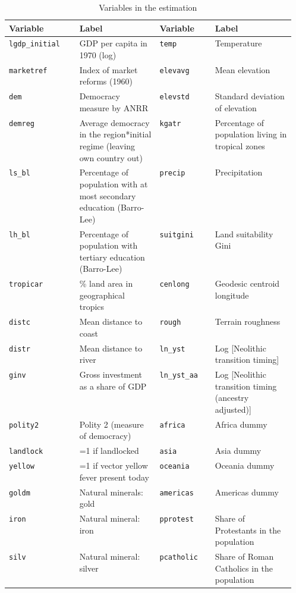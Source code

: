 \begin{table}[!htbp]
\centering
\caption{Variables in the estimation}
\label{tab:used_variables}
\begin{threeparttable}
\begin{tabular}{lp{0.28\linewidth}lp{0.28\linewidth}}
\toprule
Variable & \raggedright Label & Variable & \raggedright Label \tabularnewline
\midrule
\texttt{lgdp\_initial} & \raggedright GDP per capita in 1970 (log) & \texttt{temp} & \raggedright Temperature \tabularnewline
\texttt{marketref} & \raggedright Index of market reforms (1960) & \texttt{elevavg} & \raggedright Mean elevation \tabularnewline
\texttt{dem} & \raggedright Democracy measure by ANRR & \texttt{elevstd} & \raggedright Standard deviation of elevation \tabularnewline
\texttt{demreg} & \raggedright Average democracy in the region*initial regime (leaving own country out) & \texttt{kgatr} & \raggedright Percentage of population living in tropical zones \tabularnewline
\texttt{ls\_bl} & \raggedright Percentage of population with at most secondary education (Barro-Lee) & \texttt{precip} & \raggedright Precipitation \tabularnewline
\texttt{lh\_bl} & \raggedright Percentage of population with tertiary education (Barro-Lee) & \texttt{suitgini} & \raggedright Land suitability Gini \tabularnewline
\texttt{tropicar} & \raggedright \% land area in geographical tropics & \texttt{cenlong} & \raggedright Geodesic centroid longitude \tabularnewline
\texttt{distc} & \raggedright Mean distance to coast & \texttt{rough} & \raggedright Terrain roughness \tabularnewline
\texttt{distr} & \raggedright Mean distance to river & \texttt{ln\_yst} & \raggedright Log [Neolithic transition timing] \tabularnewline
\texttt{ginv} & \raggedright Gross investment as a share of GDP & \texttt{ln\_yst\_aa} & \raggedright Log [Neolithic transition timing (ancestry adjusted)] \tabularnewline
\texttt{polity2} & \raggedright Polity 2 (measure of democracy) & \texttt{africa} & \raggedright Africa dummy \tabularnewline
\texttt{landlock} & \raggedright =1 if landlocked & \texttt{asia} & \raggedright Asia dummy \tabularnewline
\texttt{yellow} & \raggedright =1 if vector yellow fever present today & \texttt{oceania} & \raggedright Oceania dummy \tabularnewline
\texttt{goldm} & \raggedright Natural minerals: gold & \texttt{americas} & \raggedright Americas dummy \tabularnewline
\texttt{iron} & \raggedright Natural mineral: iron & \texttt{pprotest} & \raggedright Share of Protestants in the population \tabularnewline
\texttt{silv} & \raggedright Natural mineral: silver & \texttt{pcatholic} & \raggedright Share of Roman Catholics in the population \tabularnewline

\end{tabular}
\end{threeparttable}
\end{table}
